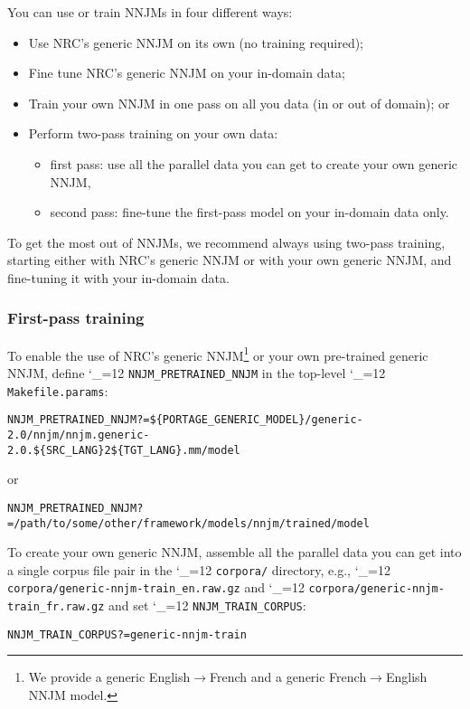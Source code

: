 \documentclass[11pt,letterpaper]{article}
\def\code{\begingroup\catcode`\_=12 \codex}
\newcommand{\codex}[1]{\texttt{#1}\endgroup}
\begin{document}
You can use or train NNJMs in four different ways:
\begin{itemize}
   \item Use NRC's generic NNJM on its own (no training required);
   \item Fine tune NRC's generic NNJM on your in-domain data;
   \item Train your own NNJM in one pass on all you data (in or out of domain); or
   \item Perform two-pass training on your own data:
      \begin{itemize}
         \item first pass: use all the parallel data you can get to create your own generic NNJM,
         \item second pass: fine-tune the first-pass model on your in-domain data only.
      \end{itemize}
\end{itemize}

To get the most out of NNJMs, we recommend always using two-pass
training, starting either with NRC's generic NNJM or with your own generic
NNJM, and fine-tuning it with your in-domain data.

\subsubsection{First-pass training}

To enable the use of NRC's generic NNJM\footnote{
   We provide a generic English$\rightarrow$French and a generic French$\rightarrow$English NNJM model.
} or your own pre-trained
generic NNJM, define \code{NNJM_PRETRAINED_NNJM} in the top-level
\code{Makefile.params}:
\begin{small}
\begin{alltt}
   NNJM_PRETRAINED_NNJM ?= \$\{PORTAGE_GENERIC_MODEL\}/generic-2.0/nnjm/nnjm.generic-
2.0.\$\{SRC_LANG\}2\$\{TGT_LANG\}.mm/model
\end{alltt}
\end{small}
or
\begin{small}
\begin{alltt}
   NNJM_PRETRAINED_NNJM ?= /path/to/some/other/framework/models/nnjm/trained/model
\end{alltt}
\end{small}

To create your own generic NNJM, assemble all the parallel data you can get
into a single corpus file pair in the \code{corpora/} directory, e.g.,
\code{corpora/generic-nnjm-train_en.raw.gz} and
\code{corpora/generic-nnjm-train_fr.raw.gz} and set \code{NNJM_TRAIN_CORPUS}:
\begin{small}
\begin{alltt}
   NNJM_TRAIN_CORPUS ?= generic-nnjm-train
\end{alltt}
\end{small}
\end{document}
